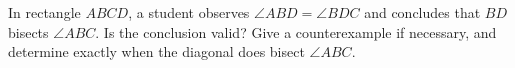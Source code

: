 In rectangle $ABCD$, a student observes $\angle ABD=\angle BDC$ and concludes that $BD$ bisects $\angle ABC$. Is the conclusion valid? Give a counterexample if necessary, and determine exactly when the diagonal does bisect $\angle ABC$.
